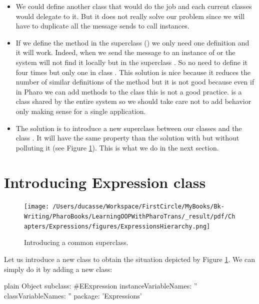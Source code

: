 \documentclass[10pt,twoside,english]{_support/latex/sbabook/sbabook}
\begin{document}
\begin{itemize}
\item We could define another class  that would do the job and each current classes would delegate to it. But it does not really solve our problem since we will have to duplicate all the message sends to call  instances. 
\item If we  define the method  in the superclass () we only need one definition and it will work. Indeed, when we send the message  to an instance of  or  the system will not find it locally but in the superclass . So no need to define it four times but only one in class . This solution is nice because it reduces the number of  similar definitions of the method  but it is not good because even if in Pharo we can add methods to the class  this is not a good practice.  is a class shared by the entire system so we should take care not to add behavior only making sense for a single application. 
\item The solution is to introduce a new superclass between our classes and the class . It will have the same property than the solution with  but without polluting it (see Figure \ref{figExpressionHierar}). This is what we do in the next section. 
\end{itemize}
\section{Introducing Expression class}

\begin{figure}

\begin{center}
\texttt{[image: /Users/ducasse/Workspace/FirstCircle/MyBooks/Bk-Writing/PharoBooks/LearningOOPWithPharoTrans/\_result/pdf/Chapters/Expressions/figures/ExpressionsHierarchy.png]}\caption{Introducing a common superclass.\label{figExpressionHierar}}\end{center}
\end{figure}


Let us introduce a new class to obtain the situation depicted by Figure \ref{figExpressionHierar}. 
We can simply do it by adding a new class:

\begin{displaycode}{plain}
Object subclass: #EExpression
	instanceVariableNames: ''
	classVariableNames: ''
	package: 'Expressions'
\end{displaycode}
\end{document}
